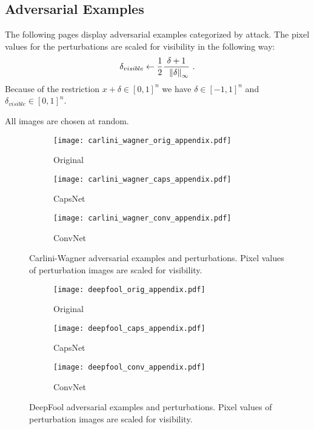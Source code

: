 \subsection{Adversarial Examples}
\label{lab:images}

The following pages display adversarial examples categorized by attack.
The pixel values for the perturbations are scaled for visibility in the following way:
\begin{equation*}
\delta_{visible} \gets \frac{1}{2}\frac{\delta + 1}{\hspace{0.6em} \norm[\infty]{\delta}}
\text{ .}
\end{equation*}
Because of the restriction $x + \delta \in [0,1]^n$ we have $\delta \in [-1,1]^n$ and $\delta_{visible} \in [0,1]^n$.

All images are chosen at random.

\begin{figure}
	\centering
	
	\begin{subfigure}{.23\textwidth}
		\centering
		\texttt{[image: carlini\_wagner\_orig\_appendix.pdf]}%
		\caption{Original}%
	\end{subfigure}%
	\begin{subfigure}{.36\textwidth}
		\centering
		\texttt{[image: carlini\_wagner\_caps\_appendix.pdf]}%
		\caption{CapsNet}
	\end{subfigure}%
	\begin{subfigure}{.36\textwidth}
		\centering
		\texttt{[image: carlini\_wagner\_conv\_appendix.pdf]}%
		\caption{ConvNet}
	\end{subfigure}
	\caption[Carlini-Wagner adversarial examples]{Carlini-Wagner adversarial examples and perturbations. Pixel values of perturbation images are scaled for visibility.}
	\label{fig:carlini-wagner-img}
	
\end{figure}


\begin{figure}
	\centering
	
	\begin{subfigure}{.23\textwidth}
		\centering
		\texttt{[image: deepfool\_orig\_appendix.pdf]}%
		\caption{Original}%
	\end{subfigure}%
	\begin{subfigure}{.36\textwidth}
		\centering
		\texttt{[image: deepfool\_caps\_appendix.pdf]}%
		\caption{CapsNet}
	\end{subfigure}%
	\begin{subfigure}{.36\textwidth}
		\centering
		\texttt{[image: deepfool\_conv\_appendix.pdf]}%
		\caption{ConvNet}
	\end{subfigure}
	\caption[DeepFool adversarial examples]{DeepFool adversarial examples and perturbations. Pixel values of perturbation images are scaled for visibility.}
	\label{fig:deepfool-img}
	
\end{figure}

